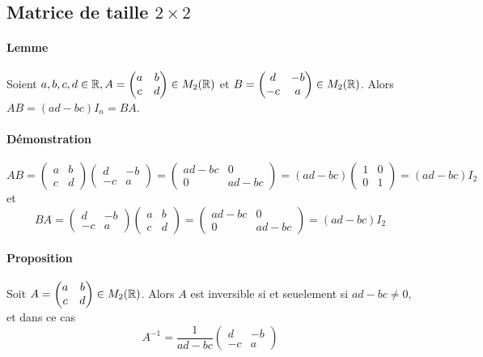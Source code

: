 %
\subsection{Matrice de taille $2\times 2$}
%
\paragraph{Lemme} Soient $a, b, c, d \in \mathbb{R}, A = \begin{pmatrix} a & b \\ c & d \end{pmatrix} \in M_{2}(\mathbb{R})$ et $B = \begin{pmatrix} d & -b \\ -c & a \end{pmatrix} \in M_{2}(\mathbb{R})$. Alors $A B = (a d - b c) I_n = B A$.

\paragraph{Démonstration} $$AB=\begin{pmatrix} a & b \\ c & d \end{pmatrix} \begin{pmatrix} d & -b \\ -c & a \end{pmatrix}=\begin{pmatrix}ad-bc &0\\0 &ad-bc\end{pmatrix}=(ad-bc)\begin{pmatrix}1& 0\\0& 1\end{pmatrix}=(ad-bc)I_2$$
et $$BA= \begin{pmatrix} d & -b \\ -c & a \end{pmatrix}\begin{pmatrix} a & b \\ c & d \end{pmatrix}=\begin{pmatrix}ad-bc &0\\0 &ad-bc\end{pmatrix}=(ad-bc)I_2$$

\paragraph{Proposition} Soit $A = \begin{pmatrix} a & b \\ c & d \end{pmatrix} \in M_{2}(\mathbb{R})$. Alors $A$ est inversible si et seuelement si $a d - b c \neq 0$, et dans ce cas
$$A^{-1} = \frac{1}{a d - b c} \begin{pmatrix} d & -b \\ -c & a \end{pmatrix}$$

